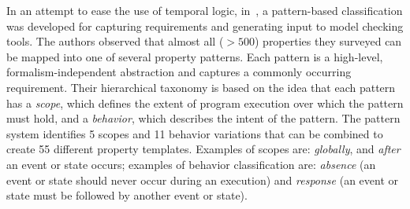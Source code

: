 \documentclass[letter]{llncs}
\begin{document}
In an attempt to ease the use of temporal logic,
in~\cite{Dwyer:1999:PPS:302405.302672}, a pattern-based classification
was developed for capturing requirements and generating input to model
checking tools. The authors observed that almost
all ($>500$)  properties they surveyed can be mapped into one of several
property patterns. Each pattern is a high-level, formalism-independent
abstraction and captures a commonly occurring requirement. Their
hierarchical taxonomy is based on the idea that each pattern has a
\emph{scope}, which defines the extent of program execution over which
the pattern must hold, and a \emph{behavior}, which describes the
intent of the pattern. The pattern system identifies 5 scopes and 11
behavior variations that can be combined to create 55 different property
templates. Examples of scopes are: \emph{globally}, and \emph{after}
an event or state occurs; examples of behavior classification are:
\emph{absence} (an event or state should never occur during an execution)
and \emph{response} (an event or state must be followed by another event
or state).
\end{document}
